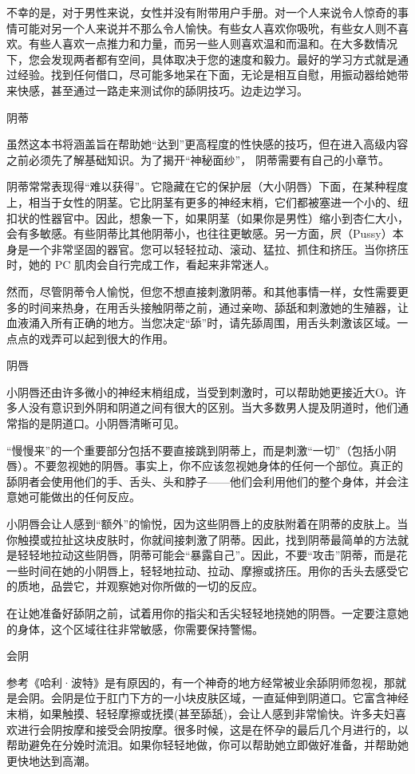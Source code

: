 \documentclass[12pt,UTF8]{ctexbook}
\begin{document}
不幸的是，对于男性来说，女性并没有附带用户手册。对一个人来说令人惊奇的事情可能对另一个人来说并不那么令人愉快。有些女人喜欢你吸吮，有些女人则不喜欢。有些人喜欢一点推力和力量，而另一些人则喜欢温和而温和。在大多数情况下，您会发现两者都有空间，具体取决于您的速度和毅力。最好的学习方式就是通过经验。找到任何借口，尽可能多地呆在下面，无论是相互自慰，用振动器给她带来快感，甚至通过一路走来测试你的舔阴技巧。边走边学习。

阴蒂

虽然这本书将涵盖旨在帮助她“达到”更高程度的性快感的技巧，但在进入高级内容之前必须先了解基础知识。为了揭开“神秘面纱”， 阴蒂需要有自己的小章节。

阴蒂常常表现得“难以获得”。它隐藏在它的保护层（大小阴唇）下面，在某种程度上，相当于女性的阴茎。它比阴茎有更多的神经末梢，它们都被塞进一个小的、纽扣状的性器官中。因此，想象一下，如果阴茎（如果你是男性）缩小到杏仁大小，会有多敏感。有些阴蒂比其他阴蒂小，也往往更敏感。另一方面，屄（Pussy）本身是一个非常坚固的器官。您可以轻轻拉动、滚动、猛拉、抓住和挤压。当你挤压时，她的 PC 肌肉会自行完成工作，看起来非常迷人。

然而，尽管阴蒂令人愉悦，但您不想直接刺激阴蒂。和其他事情一样，女性需要更多的时间来热身，在用舌头接触阴蒂之前，通过亲吻、舔舐和刺激她的生殖器，让血液涌入所有正确的地方。当您决定“舔”时，请先舔周围，用舌头刺激该区域。一点点的戏弄可以起到很大的作用。

阴唇

小阴唇还由许多微小的神经末梢组成，当受到刺激时，可以帮助她更接近大O。许多人没有意识到外阴和阴道之间有很大的区别。当大多数男人提及阴道时，他们通常指的是阴道口。小阴唇清晰可见。

“慢慢来”的一个重要部分包括不要直接跳到阴蒂上，而是刺激“一切”（包括小阴唇）。不要忽视她的阴唇。事实上，你不应该忽视她身体的任何一个部位。真正的舔阴者会使用他们的手、舌头、头和脖子——他们会利用他们的整个身体，并会注意她可能做出的任何反应。

小阴唇会让人感到“额外”的愉悦，因为这些阴唇上的皮肤附着在阴蒂的皮肤上。当你触摸或拉扯这块皮肤时，你就间接刺激了阴蒂。因此，找到阴蒂最简单的方法就是轻轻地拉动这些阴唇，阴蒂可能会“暴露自己”。因此，不要“攻击”阴蒂，而是花一些时间在她的小阴唇上，轻轻地拉动、拉动、摩擦或挤压。用你的舌头去感受它的质地，品尝它，并观察她对你所做的一切的反应。

在让她准备好舔阴之前，试着用你的指尖和舌尖轻轻地挠她的阴唇。一定要注意她的身体，这个区域往往非常敏感，你需要保持警惕。

会阴

参考《哈利·波特》是有原因的，有一个神奇的地方经常被业余舔阴师忽视，那就是会阴。会阴是位于肛门下方的一小块皮肤区域，一直延伸到阴道口。它富含神经末梢，如果触摸、轻轻摩擦或抚摸(甚至舔舐)，会让人感到非常愉快。许多夫妇喜欢进行会阴按摩和接受会阴按摩。很多时候，这是在怀孕的最后几个月进行的，以帮助避免在分娩时流泪。如果你轻轻地做，你可以帮助她立即做好准备，并帮助她更快地达到高潮。
\end{document}
